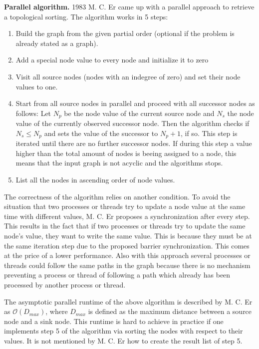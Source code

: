 \documentclass[letterpaper]{article}
\newcommand{\mypar}[1]{{\bf #1.}}
\begin{document}
 \mypar{Parallel algorithm} 
 1983 M. C. Er \cite{mcer1983} came up with a parallel approach to retrieve a topological sorting. The algorithm works in 5 steps:
 \begin{enumerate}
 	\item Build the graph from the given partial order (optional if the problem is already stated as a graph).
 	\item Add a special node value to every node and initialize it to zero
 	\item Visit all source nodes (nodes with an indegree of zero) and set their node values to one.
 	\item Start from all source nodes in parallel and proceed with all successor nodes as follows: Let $N_p$ be the node value of the current source node and $N_s$ the node value of the currently observed successor node. Then the algorithm checks if $N_s \leq N_p$ and sets the value of the successor to $N_p + 1$, if so. This step is iterated until there are no further successor nodes. If during this step a value higher than the total amount of nodes is beeing assigned to a node, this means that the input graph is not acyclic and the algorithms stops.
 	\item List all the nodes in ascending order of node values.
 \end{enumerate}

The correctness of the algorithm relies on another condition. To avoid the situation that two processes or threads try to update a node value at the same time with different values, M. C. Er proposes a synchronization after every step. This results in the fact that if two processes or threads try to update the same node's value, they want to write the same value. This is because they must be at the same iteration step due to the proposed barrier synchronization. This comes at the price of a lower performance. Also with this approach several processes or threads could follow the same paths in the graph because there is no mechanism preventing a process or thread of following a path which already has been processed by another process or thread.

The asymptotic parallel runtime of the above algorithm is described by M. C. Er as $\mathcal{O}(D_{max})$, where $D_{max}$ is defined as the maximum distance between a source node and a sink node. This runtime is hard to achieve in practice if one implements step 5 of the algorithm via sorting the nodes with respect to their values. It is not mentioned by M. C. Er how to create the result list of step 5.
\end{document}
